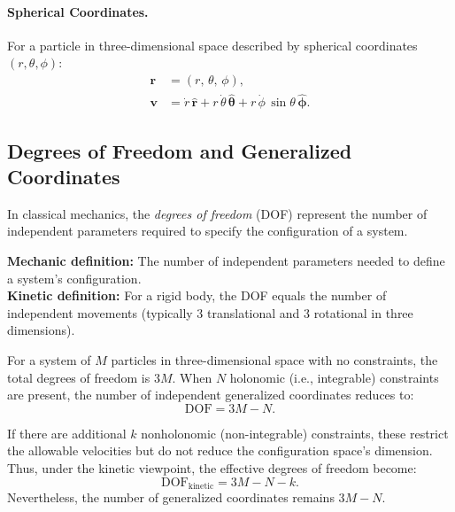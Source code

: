\paragraph{Spherical Coordinates.}  
For a particle in three-dimensional space described by spherical coordinates $(r, \theta, \phi)$:
\begin{equation}
    \begin{aligned}
        \mathbf{r} &= (r,\, \theta,\, \phi), \\
        \mathbf{v} &= \dot{r}\,\hat{\mathbf{r}} + r\,\dot{\theta}\,\hat{\boldsymbol{\theta}} + r\,\dot{\phi}\,\sin\theta\,\hat{\boldsymbol{\phi}}.
    \end{aligned}
\end{equation}

\subsection{Degrees of Freedom and Generalized Coordinates}

In classical mechanics, the \emph{degrees of freedom} (DOF) represent the number of independent parameters required to specify the configuration of a system.

\begin{definition}
    \textbf{Mechanic definition:} The number of independent parameters needed to define a system's configuration.\\[1mm]
    \textbf{Kinetic definition:} For a rigid body, the DOF equals the number of independent movements (typically 3 translational and 3 rotational in three dimensions).
\end{definition}

For a system of \(M\) particles in three-dimensional space with no constraints, the total degrees of freedom is \(3M\). When \(N\) holonomic (i.e., integrable) constraints are present, the number of independent generalized coordinates reduces to:
\begin{equation}
    \text{DOF} = 3M - N.
\end{equation}

If there are additional \(k\) nonholonomic (non-integrable) constraints, these restrict the allowable velocities but do not reduce the configuration space's dimension. Thus, under the kinetic viewpoint, the effective degrees of freedom become:
\begin{equation}
    \text{DOF}_{\text{kinetic}} = 3M - N - k.
\end{equation}
Nevertheless, the number of generalized coordinates remains \(3M - N\).

